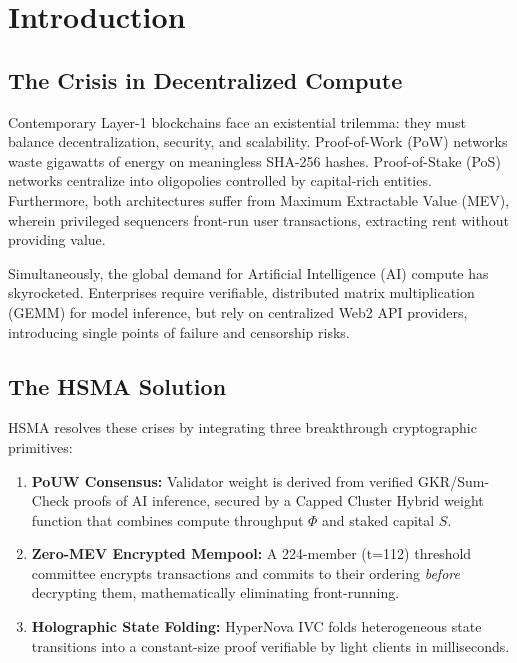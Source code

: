 \documentclass[11pt, a4paper]{article}
\begin{document}
\tableofcontents
\newpage

\section{Introduction}

\subsection{The Crisis in Decentralized Compute}

Contemporary Layer-1 blockchains face an existential trilemma: they must balance decentralization, security, and scalability. Proof-of-Work (PoW) networks waste gigawatts of energy on meaningless SHA-256 hashes. Proof-of-Stake (PoS) networks centralize into oligopolies controlled by capital-rich entities. Furthermore, both architectures suffer from Maximum Extractable Value (MEV), wherein privileged sequencers front-run user transactions, extracting rent without providing value.

Simultaneously, the global demand for Artificial Intelligence (AI) compute has skyrocketed. Enterprises require verifiable, distributed matrix multiplication (GEMM) for model inference, but rely on centralized Web2 API providers, introducing single points of failure and censorship risks.

\subsection{The HSMA Solution}

HSMA resolves these crises by integrating three breakthrough cryptographic primitives:

\begin{enumerate}
    \item \textbf{PoUW Consensus:} Validator weight is derived from verified GKR/Sum-Check proofs of AI inference, secured by a Capped Cluster Hybrid weight function that combines compute throughput $\Phi$ and staked capital $S$.
    \item \textbf{Zero-MEV Encrypted Mempool:} A 224-member (t{=}112) threshold committee encrypts transactions and commits to their ordering \textit{before} decrypting them, mathematically eliminating front-running.
    \item \textbf{Holographic State Folding:} HyperNova IVC folds heterogeneous state transitions into a constant-size proof verifiable by light clients in milliseconds.
\end{enumerate}
\end{document}
